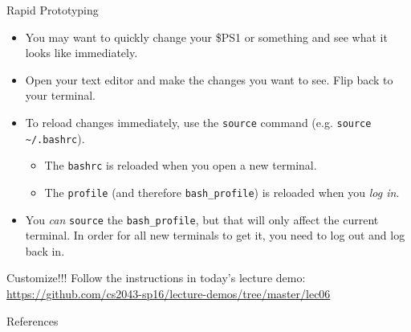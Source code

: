 \documentclass[11pt]{beamer}
\begin{document}
\begin{frame}[fragile]{Rapid Prototyping}
  \begin{itemize}[<+- | alert@+>]
    \item You may want to quickly change your \$PS1 or something and see what it looks like immediately.
    \item Open your text editor and make the changes you want to see.  Flip back to your terminal.
    \item To reload changes immediately, use the \texttt{source} command (e.g. \texttt{source \textasciitilde/.bashrc}).
    \begin{itemize}[<+- | alert@+>]
      \item The \texttt{bashrc} is reloaded when you open a new terminal.
      \item The \texttt{profile} (and therefore \texttt{bash\_profile}) is reloaded when you \emph{log in}.
    \end{itemize}
    \item You \emph{can} \texttt{source} the \texttt{bash\_profile}, but that will only affect the current terminal.
          In order for all new terminals to get it, you need to log out and log back in.
  \end{itemize}
\end{frame}

\begin{frame}[fragile]{Customize!!!}
  Follow the instructions in today's lecture demo: \href{https://github.com/cs2043-sp16/lecture-demos/tree/master/lec06}{https://github.com/cs2043-sp16/lecture-demos/tree/master/lec06}
\end{frame}

%


\begin{frame}[allowframebreaks]{References}
  
  
\end{frame}
\end{document}
